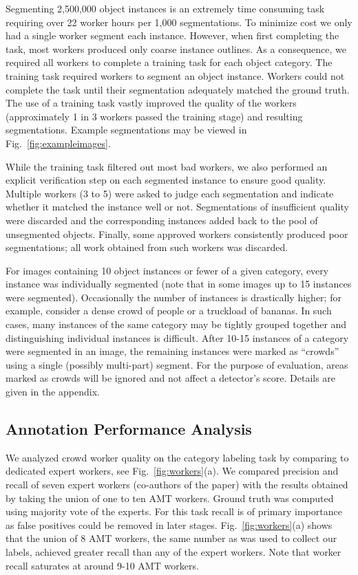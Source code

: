 Segmenting 2,500,000 object instances is an extremely time consuming task requiring over 22 worker hours per 1,000 segmentations. To minimize cost we only had a single worker segment each instance. However, when first completing the task, most workers produced only coarse instance outlines. As a consequence, we required all workers to complete a training task for each object category. The training task required workers to segment an object instance. Workers could not complete the task until their segmentation adequately matched the ground truth. The use of a training task vastly improved the quality of the workers (approximately 1 in 3 workers passed the training stage) and resulting segmentations. Example segmentations may be viewed in Fig.~\ref{fig:exampleimages}.

While the training task filtered out most bad workers, we also performed an explicit verification step on each segmented instance to ensure good quality. Multiple workers (3 to 5) were asked to judge each segmentation and indicate whether it matched the instance well or not. Segmentations of insufficient quality were discarded and the corresponding instances added back to the pool of unsegmented objects. Finally, some approved workers consistently produced poor segmentations; all work obtained from such workers was discarded.

For images containing 10 object instances or fewer of a given category, every instance was individually segmented (note that in some images up to 15 instances were segmented). Occasionally the number of instances is drastically higher; for example, consider a dense crowd of people or a truckload of bananas. In such cases, many instances of the same category may be tightly grouped together and distinguishing individual instances is difficult. After 10-15 instances of a category were segmented in an image, the remaining instances were marked as ``crowds'' using a single (possibly multi-part) segment. For the purpose of evaluation, areas marked as crowds will be ignored and not affect a detector's score. Details are given in the appendix.

\subsection{Annotation Performance Analysis}\label{sec:annotation-performance} We analyzed crowd worker quality on the category labeling task by comparing to dedicated expert workers, see Fig.~\ref{fig:workers}(a). We compared precision and recall of seven expert workers (co-authors of the paper) with the results obtained by taking the union of one to ten AMT workers. Ground truth was computed using majority vote of the experts. For this task recall is of primary importance as false positives could be removed in later stages. Fig.~\ref{fig:workers}(a) shows that the union of 8 AMT workers, the same number as was used to collect our labels, achieved greater recall than any of the expert workers. Note that worker recall saturates at around 9-10 AMT workers.

